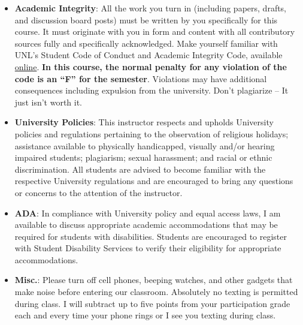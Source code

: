 \documentclass[12pt]{article}
\begin{document}
  \begin{itemize}
  \item \textbf{Academic Integrity}: All the work you turn in (including papers, drafts, and discussion board posts) must be written by you specifically for this course. It must originate with you in form and content with all contributory sources fully and specifically acknowledged. Make yourself familiar with UNL's Student Code of Conduct and Academic Integrity Code, available \href{http://stuafs.unl.edu/ja/code/three.shtml}{online}. \textbf{In this course, the normal penalty for any violation of the code is an “F” for the semester}. Violations may have additional consequences including expulsion from the university. Don't plagiarize – It just isn't worth it.
  \item \textbf{University Policies}: This instructor respects and upholds University policies and regulations pertaining to the observation of religious holidays; assistance available to physically handicapped, visually and/or hearing impaired students; plagiarism; sexual harassment; and racial or ethnic discrimination. All students are advised to become familiar with the respective University regulations and are encouraged to bring any questions or concerns to the attention of the instructor. 
  \item \textbf{ADA}: In compliance with University policy and equal access laws, I am available to discuss appropriate academic accommodations that may be required for students with disabilities. Students are encouraged to register with Student Disability Services to verify their eligibility for appropriate accommodations.
  \item \textbf{Misc.}: Please turn off cell phones, beeping watches, and other gadgets that make noise before entering our classroom. Absolutely no texting is permitted during class. I will subtract up to five points from your participation grade each and every time your phone rings or I see you texting during class.
  \end{itemize}
\end{document}
